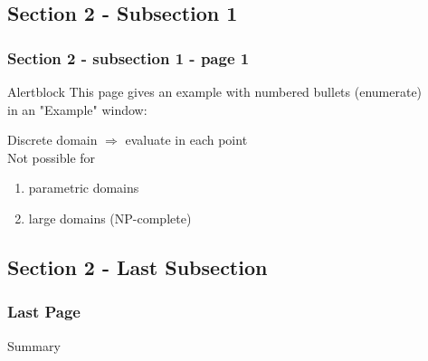 \documentclass{beamer}
\begin{document}
\subsection{Section 2 - Subsection 1}

\begin{frame}\frametitle{Section 2 - subsection 1 - page 1}
	\begin{alertblock}{Alertblock}
		This page gives an example with numbered bullets (enumerate)\\
		in an "Example" window:\\
	\end{alertblock}
	
	\begin{example}
		Discrete domain $\Rightarrow$ evaluate in each point\\
		Not possible for\\
		\begin{enumerate}
			\item <1-> parametric domains
			\item <2-> large domains (NP-complete)
		\end{enumerate}
	\end{example}
\end{frame}

\subsection[]{Section 2 - Last Subsection}

\begin{frame}\frametitle{Last Page}
	\begin{block}{Summary}
	\end{block}
\end{frame}
\end{document}
